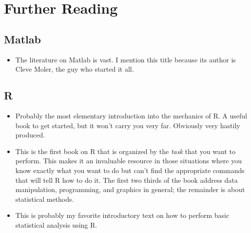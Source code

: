 \section{Further Reading}

\subsection{Matlab}

\begin{itemize}
\item {}
  The literature on Matlab is vast. I mention this title because its
  author is Cleve Moler, the guy who started it all.\vspace*{-9pt}
\end{itemize}

\subsection{R}


\begin{itemize}
\item {}
  Probably the most elementary introduction into the mechanics of R. 
  A useful book to get started, but it won't carry you very far. 
  Obviously very hastily produced.


\item {}
  This is the first book on R that is organized by the \emph{task}
  that you want to perform. This makes it an invaluable resource in
  those situations where you know exactly what you want to do but
  can't find the appropriate commands that will tell R how to do it.
  The first two thirds of the book address data manipulation,
  programming, and graphics in general; the remainder is about
  statistical methods.

\item {}
  This is probably my favorite introductory text on how to perform
  basic statistical analysis using R.
\end{itemize}


